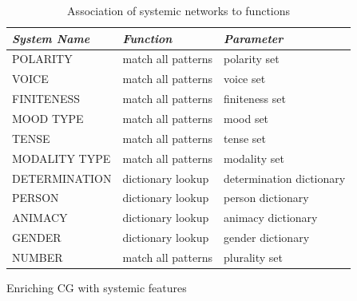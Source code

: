     \begin{table}[!ht]
        \centering
        \begin{tabulary}{\textwidth}{|L|L|L|}
            \hline
            \textit{System Name} & \textit{Function}   & \textit{Parameter} \\ \hline
            POLARITY             & match all patterns& polarity set                  \\ \hline
            VOICE                & match all patterns& voice set                   \\ \hline
            FINITENESS            & match all patterns& finiteness set                 \\ \hline
            MOOD TYPE            & match all patterns& mood set                      \\ \hline
            TENSE                & match all patterns& tense set                     \\ \hline
            MODALITY TYPE        & match all patterns& modality set                  \\ \hline
            DETERMINATION        & dictionary lookup & determination dictionary           \\ \hline
            PERSON               & dictionary lookup & person dictionary                  \\ \hline
            ANIMACY              & dictionary lookup & animacy dictionary                 \\ \hline
            GENDER               & dictionary lookup & gender dictionary                  \\ \hline
            NUMBER               & match all patterns& plurality set                 \\ \hline
        \end{tabulary}
        \caption{Association of systemic networks to functions}
        \label{tab:system-to-function-mapping}
    \end{table}

    \begin{algorithm}[!ht]
        \Input {\cg} %
        \caption{Enriching CG with systemic features}
        \label{alg:enrich-cg}
    \end{algorithm}

